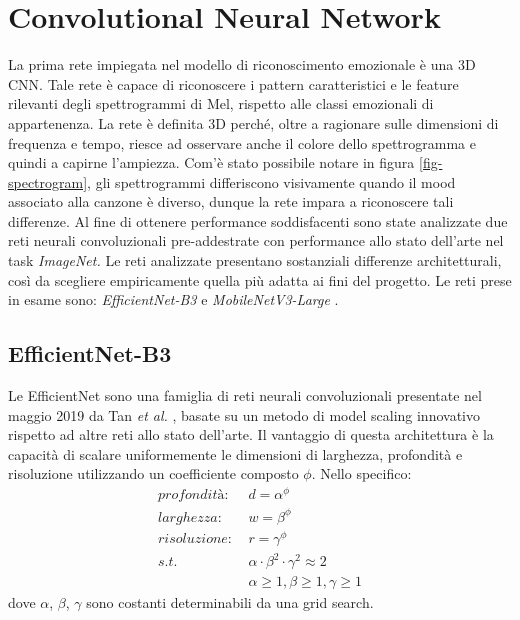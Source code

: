 \documentclass[11pt]{report}
\begin{document}
\section{Convolutional Neural Network}

La prima rete impiegata nel modello di riconoscimento emozionale è una 3D CNN. Tale rete è capace di riconoscere i pattern caratteristici e le feature rilevanti degli spettrogrammi di Mel, rispetto alle classi emozionali di appartenenza. La rete è definita 3D perché, oltre a ragionare sulle dimensioni di frequenza e tempo, riesce ad osservare anche il colore dello spettrogramma e quindi a capirne l'ampiezza. Com'è stato possibile notare in figura \ref{fig-spectrogram}, gli spettrogrammi differiscono visivamente quando il mood associato alla canzone è diverso, dunque la rete impara a riconoscere tali differenze.
Al fine di ottenere performance soddisfacenti sono state analizzate due reti neurali convoluzionali pre-addestrate con performance allo stato dell'arte nel task \textit{ImageNet.} Le reti analizzate presentano sostanziali differenze architetturali, così da scegliere empiricamente quella più adatta ai fini del progetto. Le reti prese in esame sono: \textit{EfficientNet-B3} \cite{tan2019efficientnet} e \textit{MobileNetV3-Large} \cite{howard2019searching}.

\newpage

\subsection{EfficientNet-B3}


Le EfficientNet sono una famiglia di reti neurali convoluzionali presentate nel maggio 2019 da Tan \textit{et al.} \cite{tan2019efficientnet}, basate su un metodo di model scaling innovativo rispetto ad altre reti allo stato dell'arte. Il vantaggio di questa architettura è la capacità di scalare uniformemente le dimensioni di larghezza, profondità e risoluzione utilizzando un coefficiente composto $\phi$. Nello specifico:
        \begin{equation}
            \begin{split}
                profondità:&\ d = \alpha^\phi\\
                larghezza:&\ w = \beta^\phi\\
                risoluzione:&\  r = \gamma^\phi\\
                s.t.&\ \alpha \cdot \beta^2 \cdot \gamma^2 \approx 2\\
                &\ \alpha\geq1, \beta\geq1, \gamma\geq1
            \end{split}
        \end{equation}
        dove $\alpha$, $\beta$, $\gamma$ sono costanti determinabili da una grid search.\\
        
\end{document}
